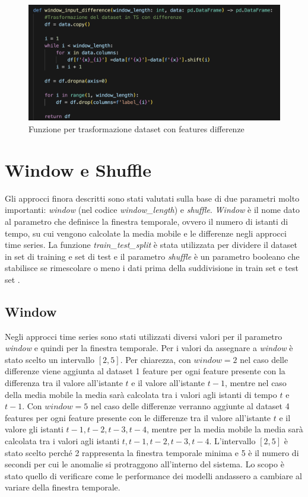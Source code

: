 \begin{figure}[H]
    \centering
    \includegraphics[width=0.9\linewidth]{def_ts_diff.png}
    \caption{Funzione per trasformazione dataset con features differenze}
    \label{fig:enter-label}
\end{figure}

\section{Window e Shuffle}
Gli approcci finora descritti sono stati valutati sulla base di due parametri molto importanti: \textit{window} (nel codice \textit{window\_length}) e \textit{shuffle}. \textit{Window} \`e il nome dato al parametro che definisce la finestra temporale, ovvero il numero di istanti di tempo, su cui vengono calcolate la media mobile e le differenze negli approcci time series. La funzione \textit{train\_test\_split} \`e stata utilizzata per dividere il dataset in set di training e set di test e il parametro \textit{shuffle} \`e un parametro booleano che stabilisce se rimescolare o meno i dati prima della suddivisione in train set e test set \cite{train_test_split}.

\subsection{Window}
Negli approcci time series sono stati utilizzati diversi valori per il parametro \textit{window} e quindi per la finestra temporale. Per i valori da assegnare a \textit{window} \`e stato scelto un intervallo $[2,5]$. Per chiarezza, con $window=2$ nel caso delle differenze viene aggiunta al dataset 1 feature per ogni feature presente con la differenza tra il valore all'istante $t$ e il valore all'istante $t-1$, mentre nel caso della media mobile la media sar\`a calcolata tra i valori agli istanti di tempo $t$ e $t-1$. Con $window=5$ nel caso delle differenze verranno aggiunte al dataset 4 features per ogni feature presente con le differenze tra il valore all'istante $t$ e il valore gli istanti $t-1,t-2,t-3,t-4$, mentre per la media mobile la media sar\`a calcolata tra i valori agli istanti $t,t-1,t-2,t-3,t-4$.
L'intervallo $[2,5]$ \`e stato scelto perch\'e 2 rappresenta la finestra temporale minima e 5 \`e il numero di secondi per cui le anomalie si protraggono all'interno del sistema.
Lo scopo \`e stato quello di verificare come le performance dei modelli andassero a cambiare al variare della finestra temporale.

